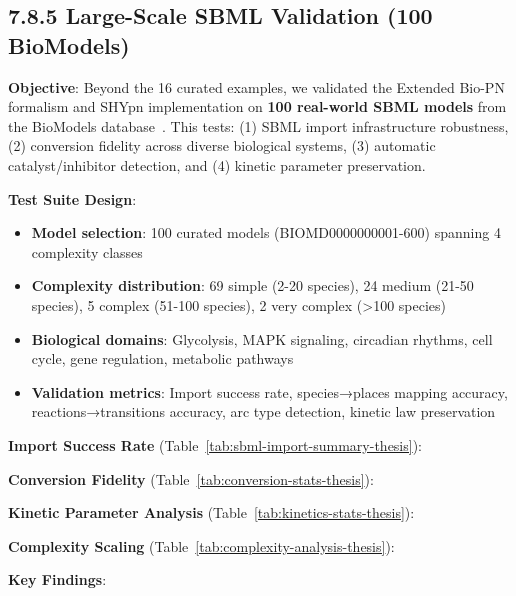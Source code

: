\hypertarget{large-scale-sbml-validation}{%
\subsection{7.8.5 Large-Scale SBML Validation (100 BioModels)}\label{large-scale-sbml-validation}}

\textbf{Objective}: Beyond the 16 curated examples, we validated the Extended Bio-PN formalism and SHYpn implementation on \textbf{100 real-world SBML models} from the BioModels database~\cite{Malik-Sheriff2020}. This tests: (1) SBML import infrastructure robustness, (2) conversion fidelity across diverse biological systems, (3) automatic catalyst/inhibitor detection, and (4) kinetic parameter preservation.

\textbf{Test Suite Design}:
\begin{itemize}
    \item \textbf{Model selection}: 100 curated models (BIOMD0000000001-600) spanning 4 complexity classes
    \item \textbf{Complexity distribution}: 69 simple (2-20 species), 24 medium (21-50 species), 5 complex (51-100 species), 2 very complex (>100 species)
    \item \textbf{Biological domains}: Glycolysis, MAPK signaling, circadian rhythms, cell cycle, gene regulation, metabolic pathways
    \item \textbf{Validation metrics}: Import success rate, species→places mapping accuracy, reactions→transitions accuracy, arc type detection, kinetic law preservation
\end{itemize}

\textbf{Import Success Rate} (Table~\ref{tab:sbml-import-summary-thesis}):



\textbf{Conversion Fidelity} (Table~\ref{tab:conversion-stats-thesis}):



\textbf{Kinetic Parameter Analysis} (Table~\ref{tab:kinetics-stats-thesis}):



\textbf{Complexity Scaling} (Table~\ref{tab:complexity-analysis-thesis}):



\textbf{Key Findings}:

